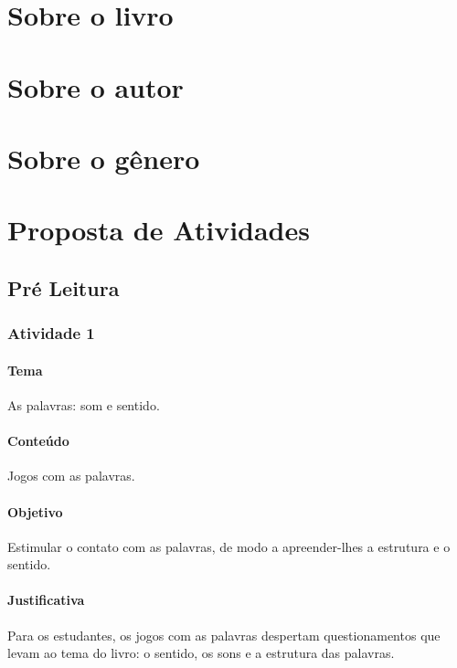 \documentclass[11pt]{extarticle}
\begin{document}
\section{Sobre o livro}

\section{Sobre o autor}

\section{Sobre o gênero}

\section{Proposta de Atividades}
\subsection{Pré Leitura}
\subsubsection{Atividade 1}


\paragraph{Tema} As palavras: som e sentido. 

\paragraph{Conteúdo} Jogos com as palavras. 

\paragraph{Objetivo} Estimular o contato com as palavras, de modo a apreender-lhes a estrutura e o sentido. 

\paragraph{Justificativa} Para os estudantes, os jogos com as palavras despertam questionamentos que levam ao tema do livro: o sentido, os sons e a estrutura das palavras.   
\end{document}

